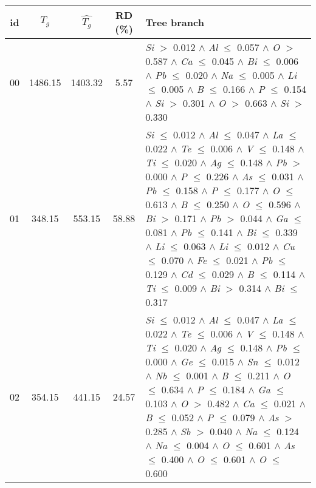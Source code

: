 \begin{table}[!htbp]
	\setlength{\tabcolsep}{3pt}
	\begin{tabular}{ccccm{}}
		\toprule
		id & $T_g$ & $\hat{T_g}$ & RD (\%) & Tree branch\\
		\midrule
		00 & 1486.15 & 1403.32 & 5.57 & \textit{Si} $>$ 0.012 $\wedge$ \textit{Al} $\le$ 0.057 $\wedge$ \textit{O} $>$ 0.587 $\wedge$ \textit{Ca} $\le$ 0.045 $\wedge$ \textit{Bi} $\le$ 0.006 $\wedge$ \textit{Pb} $\le$ 0.020 $\wedge$ \textit{Na} $\le$ 0.005 $\wedge$ \textit{Li} $\le$ 0.005 $\wedge$ \textit{B} $\le$ 0.166 $\wedge$ \textit{P} $\le$ 0.154 $\wedge$ \textit{Si} $>$ 0.301 $\wedge$ \textit{O} $>$ 0.663 $\wedge$ \textit{Si} $>$ 0.330\\
		\hline
		01 & 348.15 & 553.15 & 58.88 & \textit{Si} $\le$ 0.012 $\wedge$ \textit{Al} $\le$ 0.047 $\wedge$ \textit{La} $\le$ 0.022 $\wedge$ \textit{Te} $\le$ 0.006 $\wedge$ \textit{V} $\le$ 0.148 $\wedge$ \textit{Ti} $\le$ 0.020 $\wedge$ \textit{Ag} $\le$ 0.148 $\wedge$ \textit{Pb} $>$ 0.000 $\wedge$ \textit{P} $\le$ 0.226 $\wedge$ \textit{As} $\le$ 0.031 $\wedge$ \textit{Pb} $\le$ 0.158 $\wedge$ \textit{P} $\le$ 0.177 $\wedge$ \textit{O} $\le$ 0.613 $\wedge$ \textit{B} $\le$ 0.250 $\wedge$ \textit{O} $\le$ 0.596 $\wedge$ \textit{Bi} $>$ 0.171 $\wedge$ \textit{Pb} $>$ 0.044 $\wedge$ \textit{Ga} $\le$ 0.081 $\wedge$ \textit{Pb} $\le$ 0.141 $\wedge$ \textit{Bi} $\le$ 0.339 $\wedge$ \textit{Li} $\le$ 0.063 $\wedge$ \textit{Li} $\le$ 0.012 $\wedge$ \textit{Cu} $\le$ 0.070 $\wedge$ \textit{Fe} $\le$ 0.021 $\wedge$ \textit{Pb} $\le$ 0.129 $\wedge$ \textit{Cd} $\le$ 0.029 $\wedge$ \textit{B} $\le$ 0.114 $\wedge$ \textit{Ti} $\le$ 0.009 $\wedge$ \textit{Bi} $>$ 0.314 $\wedge$ \textit{Bi} $\le$ 0.317\\
		\hline
		02 & 354.15 & 441.15 & 24.57 & \textit{Si} $\le$ 0.012 $\wedge$ \textit{Al} $\le$ 0.047 $\wedge$ \textit{La} $\le$ 0.022 $\wedge$ \textit{Te} $\le$ 0.006 $\wedge$ \textit{V} $\le$ 0.148 $\wedge$ \textit{Ti} $\le$ 0.020 $\wedge$ \textit{Ag} $\le$ 0.148 $\wedge$ \textit{Pb} $\le$ 0.000 $\wedge$ \textit{Ge} $\le$ 0.015 $\wedge$ \textit{Sn} $\le$ 0.012 $\wedge$ \textit{Nb} $\le$ 0.001 $\wedge$ \textit{B} $\le$ 0.211 $\wedge$ \textit{O} $\le$ 0.634 $\wedge$ \textit{P} $\le$ 0.184 $\wedge$ \textit{Ga} $\le$ 0.103 $\wedge$ \textit{O} $>$ 0.482 $\wedge$ \textit{Ca} $\le$ 0.021 $\wedge$ \textit{B} $\le$ 0.052 $\wedge$ \textit{P} $\le$ 0.079 $\wedge$ \textit{As} $>$ 0.285 $\wedge$ \textit{Sb} $>$ 0.040 $\wedge$ \textit{Na} $\le$ 0.124 $\wedge$ \textit{Na} $\le$ 0.004 $\wedge$ \textit{O} $\le$ 0.601 $\wedge$ \textit{As} $\le$ 0.400 $\wedge$ \textit{O} $\le$ 0.601 $\wedge$ \textit{O} $\le$ 0.600\\

\end{tabular}
\end{table}
